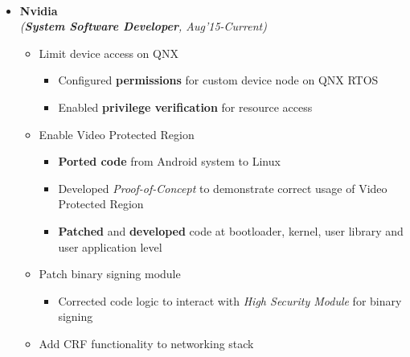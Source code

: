 \\[\lsep]

\begin{itemize}
	\itemsep-0.25em
	\item \textbf{Nvidia} \\
	\emph{(\textbf{System Software Developer}, Aug'15-Current)} \\[-0.7cm]

        \vspace{-0.25em}
	\begin{itemize}
	    \itemsep-0.25em

	    \item Limit device access on QNX
            \vspace{-0.25em}

	    	\begin{itemize}\itemsep \isep
	    	\item Configured \textbf{permissions} for custom device node on QNX RTOS
	    	\item Enabled \textbf{privilege verification} for resource access
	    	\end{itemize}

	    \item Enable Video Protected Region
            \vspace{-0.25em}

	    	\begin{itemize}\itemsep \isep
	    	\item \textbf{Ported code} from Android system to Linux
	    	\item Developed \textit{Proof-of-Concept} to demonstrate correct usage of Video Protected Region
	    	\item \textbf{Patched} and \textbf{developed} code at bootloader, kernel, user library and user application level
	    	\end{itemize}

	    \item Patch binary signing module
            \vspace{-0.25em}

	    	\begin{itemize}\itemsep \isep
	    	\item Corrected code logic to interact with \textit{High Security Module} for binary signing
	    	\end{itemize}

	    \item Add CRF functionality to networking stack
            \vspace{-0.25em}


\end{itemize}
\end{itemize}
